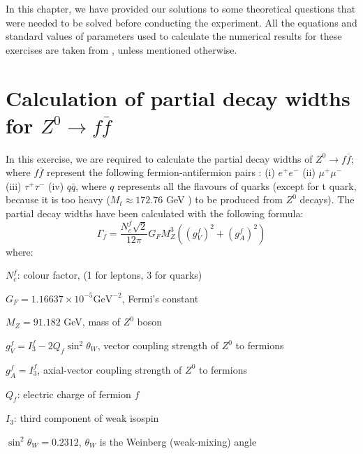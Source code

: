 In this chapter, we have provided our solutions to some theoretical questions that were needed to be solved before conducting the experiment. All the equations and standard values of parameters used to calculate the numerical results for these exercises are taken from \cite{UB}, unless mentioned otherwise.
\section{Calculation of partial decay widths for $Z^{0}\rightarrow f\bar{f}$}
In this exercise, we are required to calculate the partial decay widths of $Z^{0}\rightarrow f\bar{f}$; where $f\bar{f}$ represent the following fermion-antifermion pairs : (i) $e^{+}e^{-}$ (ii) $\mu^{+}\mu^{-}$ (iii) $\tau^{+}\tau^{-}$ (iv) $q\bar{q}$, where $q$ represents all the flavours of quarks (except for t quark, because it is too heavy ($M_{t}\approx 172.76$ GeV \cite{Zyla:2020zbs}) to be produced from $Z^{0}$ decays). The partial decay widths have been calculated with the following formula:
\begin{equation}
\Gamma_{f}=\dfrac{N_{c}^{f}\sqrt{2}}{12\pi}G_{F}M_{Z}^{3}\left(\left(g_{V}^{f}\right)^{2}+\left(g_{A}^{f}\right)^{2}\right)
\end{equation}
where:
\begin{description}
\item $N_{c}^{f}$: colour factor, (1 for leptons, 3 for quarks)
\item $G_{F}=1.16637\times 10^{-5}\mathrm{GeV}^{-2}$, Fermi's constant 
\item $M_{Z}=91.182$ GeV, mass of $Z^{0}$ boson
\item $g_{V}^{f}=I_{3}^{f}-2Q_{f}\sin^{2}\theta_{W}$, vector coupling strength of $Z^{0}$ to fermions
\item $g_{A}^{f}=I_{3}^{f}$, axial-vector coupling strength of $Z^{0}$ to fermions
\item $Q_{f}$: electric charge of fermion $f$
\item $I_{3}$: third component of weak isospin
\item $\sin^{2}\theta_{W}=0.2312$, $\theta_{W}$ is the Weinberg (weak-mixing) angle
\end{description}

